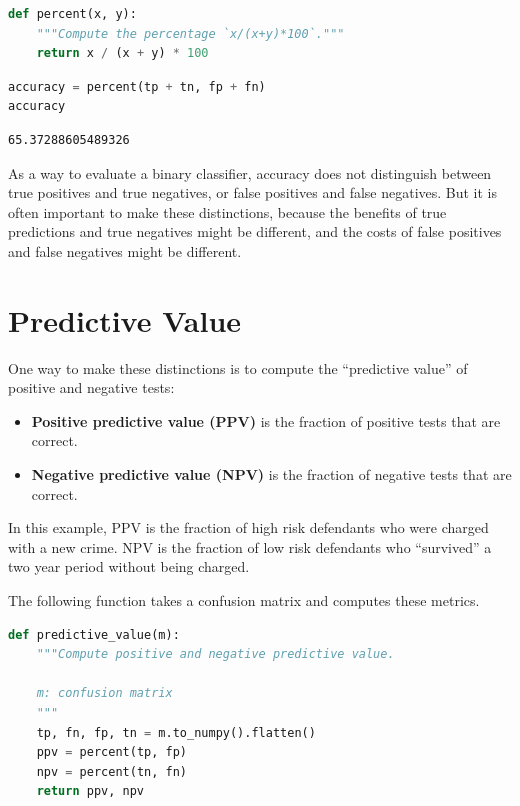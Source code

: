 \begin{lstlisting}[language=Python,style=source]
def percent(x, y):
    """Compute the percentage `x/(x+y)*100`."""
    return x / (x + y) * 100
\end{lstlisting}

\begin{lstlisting}[language=Python,style=source]
accuracy = percent(tp + tn, fp + fn)
accuracy
\end{lstlisting}

\begin{lstlisting}[style=output]
65.37288605489326
\end{lstlisting}

As a way to evaluate a binary classifier, accuracy does not distinguish
between true positives and true negatives, or false positives and false
negatives. But it is often important to make these distinctions, because
the benefits of true predictions and true negatives might be different,
and the costs of false positives and false negatives might be different.

\hypertarget{predictive-value}{%
\section{Predictive Value}\label{predictive-value}}

One way to make these distinctions is to compute the ``predictive
value'' of positive and negative tests:

\begin{itemize}
\item
  \textbf{Positive predictive value (PPV)} is the fraction of positive
  tests that are correct.
\item
  \textbf{Negative predictive value (NPV)} is the fraction of negative
  tests that are correct.
\end{itemize}

In this example, PPV is the fraction of high risk defendants who were
charged with a new crime. NPV is the fraction of low risk defendants who
``survived'' a two year period without being charged.

The following function takes a confusion matrix and computes these
metrics.

\begin{lstlisting}[language=Python,style=source]
def predictive_value(m):
    """Compute positive and negative predictive value.

    m: confusion matrix
    """
    tp, fn, fp, tn = m.to_numpy().flatten()
    ppv = percent(tp, fp)
    npv = percent(tn, fn)
    return ppv, npv
\end{lstlisting}

